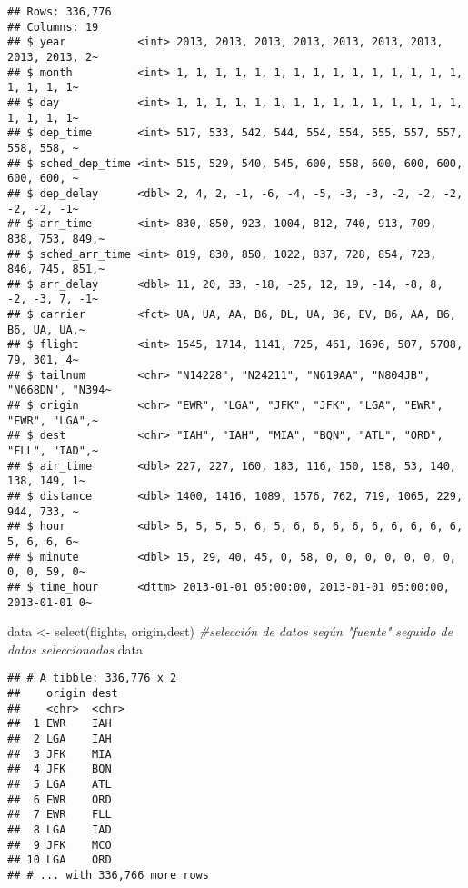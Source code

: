 \documentclass[
]{article}
\newenvironment{Shaded}{\begin{snugshade}}{\end{snugshade}}
\newcommand{\CommentTok}[1]{\textcolor[rgb]{0.56,0.35,0.01}{\textit{#1}}}
\newcommand{\FunctionTok}[1]{\textcolor[rgb]{0.00,0.00,0.00}{#1}}
\newcommand{\NormalTok}[1]{#1}
\newcommand{\OtherTok}[1]{\textcolor[rgb]{0.56,0.35,0.01}{#1}}
\begin{document}
\begin{verbatim}
## Rows: 336,776
## Columns: 19
## $ year           <int> 2013, 2013, 2013, 2013, 2013, 2013, 2013, 2013, 2013, 2~
## $ month          <int> 1, 1, 1, 1, 1, 1, 1, 1, 1, 1, 1, 1, 1, 1, 1, 1, 1, 1, 1~
## $ day            <int> 1, 1, 1, 1, 1, 1, 1, 1, 1, 1, 1, 1, 1, 1, 1, 1, 1, 1, 1~
## $ dep_time       <int> 517, 533, 542, 544, 554, 554, 555, 557, 557, 558, 558, ~
## $ sched_dep_time <int> 515, 529, 540, 545, 600, 558, 600, 600, 600, 600, 600, ~
## $ dep_delay      <dbl> 2, 4, 2, -1, -6, -4, -5, -3, -3, -2, -2, -2, -2, -2, -1~
## $ arr_time       <int> 830, 850, 923, 1004, 812, 740, 913, 709, 838, 753, 849,~
## $ sched_arr_time <int> 819, 830, 850, 1022, 837, 728, 854, 723, 846, 745, 851,~
## $ arr_delay      <dbl> 11, 20, 33, -18, -25, 12, 19, -14, -8, 8, -2, -3, 7, -1~
## $ carrier        <fct> UA, UA, AA, B6, DL, UA, B6, EV, B6, AA, B6, B6, UA, UA,~
## $ flight         <int> 1545, 1714, 1141, 725, 461, 1696, 507, 5708, 79, 301, 4~
## $ tailnum        <chr> "N14228", "N24211", "N619AA", "N804JB", "N668DN", "N394~
## $ origin         <chr> "EWR", "LGA", "JFK", "JFK", "LGA", "EWR", "EWR", "LGA",~
## $ dest           <chr> "IAH", "IAH", "MIA", "BQN", "ATL", "ORD", "FLL", "IAD",~
## $ air_time       <dbl> 227, 227, 160, 183, 116, 150, 158, 53, 140, 138, 149, 1~
## $ distance       <dbl> 1400, 1416, 1089, 1576, 762, 719, 1065, 229, 944, 733, ~
## $ hour           <dbl> 5, 5, 5, 5, 6, 5, 6, 6, 6, 6, 6, 6, 6, 6, 6, 5, 6, 6, 6~
## $ minute         <dbl> 15, 29, 40, 45, 0, 58, 0, 0, 0, 0, 0, 0, 0, 0, 0, 59, 0~
## $ time_hour      <dttm> 2013-01-01 05:00:00, 2013-01-01 05:00:00, 2013-01-01 0~
\end{verbatim}

\begin{Shaded}
\begin{Highlighting}[]
\NormalTok{  data }\OtherTok{\textless{}{-}} \FunctionTok{select}\NormalTok{(flights, origin,dest) }\CommentTok{\#selección de datos según "fuente" seguido de datos            seleccionados}
\NormalTok{  data}
\end{Highlighting}
\end{Shaded}

\begin{verbatim}
## # A tibble: 336,776 x 2
##    origin dest 
##    <chr>  <chr>
##  1 EWR    IAH  
##  2 LGA    IAH  
##  3 JFK    MIA  
##  4 JFK    BQN  
##  5 LGA    ATL  
##  6 EWR    ORD  
##  7 EWR    FLL  
##  8 LGA    IAD  
##  9 JFK    MCO  
## 10 LGA    ORD  
## # ... with 336,766 more rows
\end{verbatim}
\end{document}
